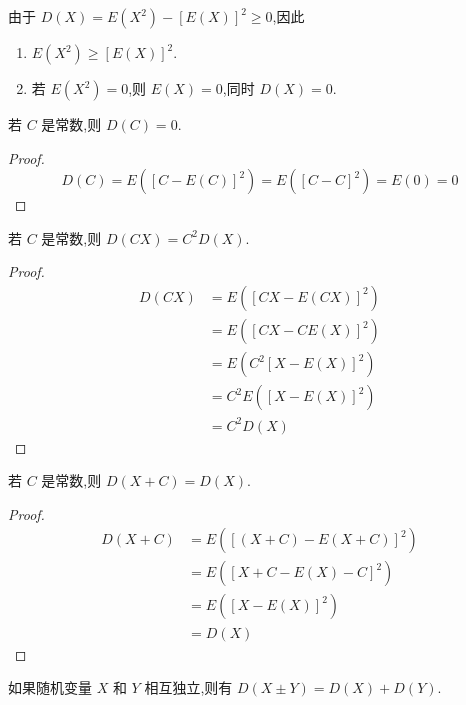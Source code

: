 \begin{corollary}
    \indent 由于 $D(X) = E(X^2) - [E(X)]^2 \geqslant 0$,因此
    \begin{enumerate}
        \item $E(X^2) \geqslant [E(X)]^2$.
        \item 若 $E(X^2) = 0$,则 $E(X)=0$,同时 $D(X)=0$.
    \end{enumerate}
\end{corollary}

\begin{property}
    \indent 若 $C$ 是常数,则 $D(C) = 0$.
\end{property}

\begin{proof}
    $$
    D(C) = E([C-E(C)]^2) = E([C-C]^2) = E(0) = 0
    $$
\end{proof}

\begin{property}
    \indent 若 $C$ 是常数,则 $D(CX) = C^2 D(X)$.
\end{property}

\begin{proof}
    $$
    \begin{aligned}
        D(CX) &= E([CX - E(CX)]^2) \\
        &= E([CX - CE(X)]^2) \\
        &= E(C^2 [X-E(X)]^2) \\
        &= C^2 E([X-E(X)]^2) \\
        &= C^2 D(X)
    \end{aligned}
    $$
\end{proof}

\begin{property}
    \indent 若 $C$ 是常数,则 $D(X+C) = D(X)$.
\end{property}

\begin{proof}
    $$
    \begin{aligned}
        D(X+C) &= E([(X+C) - E(X+C)]^2) \\
        &= E([X + C - E(X) - C]^2) \\
        &= E([X-E(X)]^2) \\
        &= D(X)
    \end{aligned}
    $$
\end{proof}

\begin{property}[][][prop:D(X+Y)=D(X)+D(Y)]
    \indent 如果随机变量 $X$ 和 $Y$ 相互独立,则有 $D(X \pm Y) = D(X)+D(Y)$.
\end{property}

